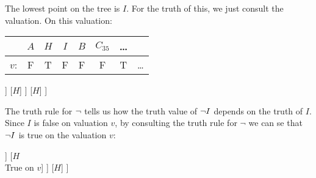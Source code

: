 The lowest point on the tree is $I$. For the truth of this, we just consult the valuation. On this valuation:
\begin{center}
	\begin{tabular}{rccccccc}
		&	$A$&$H$&$I$&$B$&$C_{35}$&\ldots\\\hline
		$v$:&	F & T &F&F&F&T&\ldots
	\end{tabular}
\end{center}
\begin{center}
	\begin{forest}
	[$(\enot I\eand H)\mainconnective{\eif} H$
	[$(\enot I\mainconnective{\eor} H)$
	[$\mainconnective{\enot} I$
	[$I$\\False on $v$]
	]
	[$H$]
	]
	[$H$]
	]
\end{forest}
\end{center}
%		

The truth rule for $\neg$ tells us how the truth value of $\neg I$ depends on the truth of $I$. 
Since $I$ is false on valuation $v$, by consulting the truth rule for $\neg$ we can se that $\neg I$ is true on the valuation $v$:
\begin{center}
	\begin{forest}
		[$(\enot I\eand H)\mainconnective{\eif} H$
		[$(\enot I\mainconnective{\eand} H)$
		[$\mainconnective{\enot} I$\\True on $v$
		[$I$\\False on $v$]
		]
		[$H$\\True on $v$]
		]
		[$H$]
		]
	\end{forest}
\end{center}

